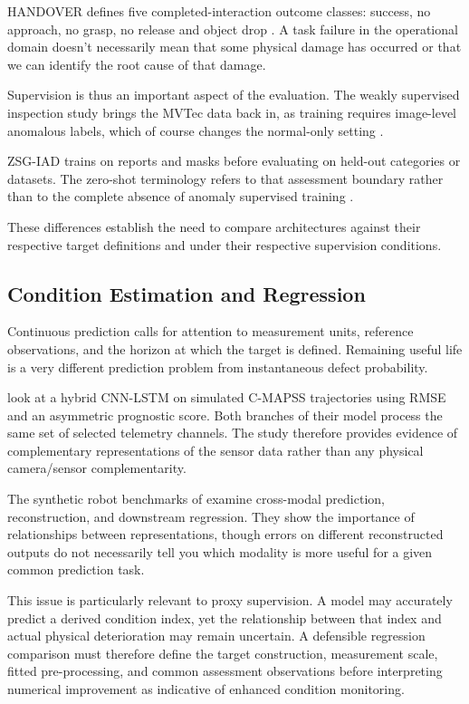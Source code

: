 HANDOVER defines five completed-interaction outcome classes: success, no approach, no grasp, no
release and object drop \parencite{Thoduka2024Handover}. A task failure in the operational domain
doesn't necessarily mean that some physical damage has occurred or that we can identify the root
cause of that damage.

Supervision is thus an important aspect of the evaluation. The weakly supervised inspection study
brings the MVTec data back in, as training requires image-level anomalous labels, which of course
changes the normal-only setting \parencite[p.~6659]{P035}.

ZSG-IAD trains on reports and masks before evaluating on held-out categories or datasets. The
zero-shot terminology refers to that assessment boundary rather than to the complete absence of
anomaly supervised training \parencite[pp.~6, 8--9]{P025}.

These differences establish the need to compare architectures against their respective target
definitions and under their respective supervision conditions.

\subsection{Condition Estimation and Regression}

Continuous prediction calls for attention to measurement units, reference observations, and the
horizon at which the target is defined. Remaining useful life is a very different prediction problem
from instantaneous defect probability.

\textcite{AlDulaimi2019A} look at a hybrid CNN-LSTM on simulated C-MAPSS trajectories using RMSE and an
asymmetric prognostic score. Both branches of their model process the same
set of selected telemetry channels. The study therefore provides evidence of complementary
representations of the sensor data rather than any physical camera/sensor complementarity.

The synthetic robot benchmarks of \textcite{Altinses2025Performance} examine cross-modal prediction,
reconstruction, and downstream regression. They show the importance
of relationships between representations, though errors on different reconstructed outputs do not
necessarily tell you which modality is more useful for a given common prediction task.

This issue is particularly relevant to proxy supervision. A model may accurately predict a derived
condition index, yet the relationship between that index and actual physical deterioration may
remain uncertain. A defensible regression comparison must therefore define the target construction,
measurement scale, fitted pre-processing, and common assessment observations before interpreting
numerical improvement as indicative of enhanced condition monitoring.

